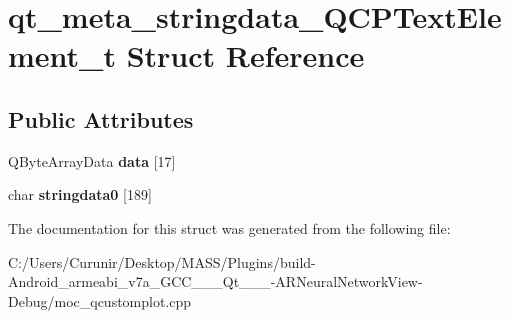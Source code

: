 \hypertarget{structqt__meta__stringdata___q_c_p_text_element__t}{}\section{qt\+\_\+meta\+\_\+stringdata\+\_\+\+Q\+C\+P\+Text\+Element\+\_\+t Struct Reference}
\label{structqt__meta__stringdata___q_c_p_text_element__t}
\subsection*{Public Attributes}
\begin{DoxyCompactItemize}
\item 
\mbox{\label{structqt__meta__stringdata___q_c_p_text_element__t_aded43a56213e921bd55feee447df5d71}} 
Q\+Byte\+Array\+Data {\bfseries data} \mbox{[}17\mbox{]}
\item 
\mbox{\label{structqt__meta__stringdata___q_c_p_text_element__t_a227551c5c6e7d2b032c49d054676fe7a}} 
char {\bfseries stringdata0} \mbox{[}189\mbox{]}
\end{DoxyCompactItemize}


The documentation for this struct was generated from the following file\+:\begin{DoxyCompactItemize}
\item 
C\+:/\+Users/\+Curunir/\+Desktop/\+M\+A\+S\+S/\+Plugins/build-\/\+Android\+\_\+armeabi\+\_\+v7a\+\_\+\+G\+C\+C\+\_\+\_\+\_\+\+Qt\+\_\+\_\+\_-\/\+A\+R\+Neural\+Network\+View-\/\+Debug/moc\+\_\+qcustomplot.\+cpp\end{DoxyCompactItemize}
